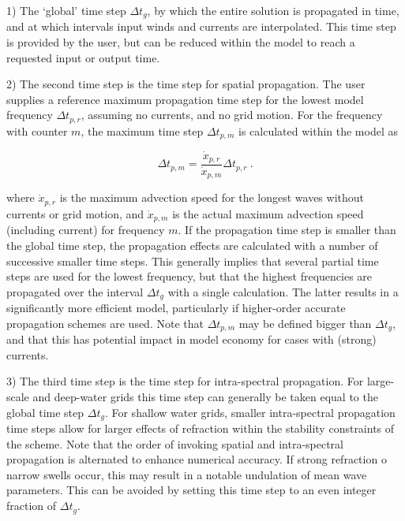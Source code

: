 \begin{list}{xx}{\itemsep 0mm \parsep 0mm \rightmargin 5mm}

\item[1)] The `global' time step $\Delta t_g$, by which the entire solution is
propagated in time, and at which intervals input winds and currents are
interpolated. This time step is provided by the user, but can be reduced
within the model to reach a requested input or output time.

\item[2)] The second time step is the time step for spatial propagation. The
user supplies a reference maximum propagation time step for the lowest model
frequency $\Delta t_{p,r}$, assuming no currents, and no grid motion. For the
frequency with counter $m$, the maximum time step $\Delta t_{p,m}$ is
calculated within the model as


\begin{equation}
\Delta t_{p,m} = \frac{{\dot{x}}_{p,r}}{{\dot{x}}_{p,m}} \Delta t_{p,r}
\: . \label{eq:dtpl} \end{equation}

\noindent
where $\dot{x}_{p,r}$ is the maximum advection speed for the longest waves
without currents or grid motion, and $\dot{x}_{p,m}$ is the actual maximum
advection speed (including current) for frequency $m$. If the propagation time
step is smaller than the global time step, the propagation effects are
calculated with a number of successive smaller time steps. This generally
implies that several partial time steps are used for the lowest frequency, but
that the highest frequencies are propagated over the interval $\Delta t_g$
with a single calculation. The latter results in a significantly more
efficient model, particularly if higher-order accurate propagation schemes are
used. Note that $\Delta t_{p,m}$ may be defined bigger than $\Delta t_g$, and
that this has potential impact in model economy for cases with (strong)
currents.

\item[3)] The third time step is the time step for intra-spectral
propagation. For large-scale and deep-water grids this time step can generally
be taken equal to the global time step $\Delta t_g$. For shallow water grids,
smaller intra-spectral propagation time steps allow for larger effects of
refraction within the stability constraints of the scheme. Note that the order
of invoking spatial and intra-spectral propagation is alternated to enhance
numerical accuracy. If strong refraction o narrow swells occur, this may
result in a notable undulation of mean wave parameters. This can be avoided by
setting this time step to an even integer fraction of $\Delta t_g$.


\end{list}
